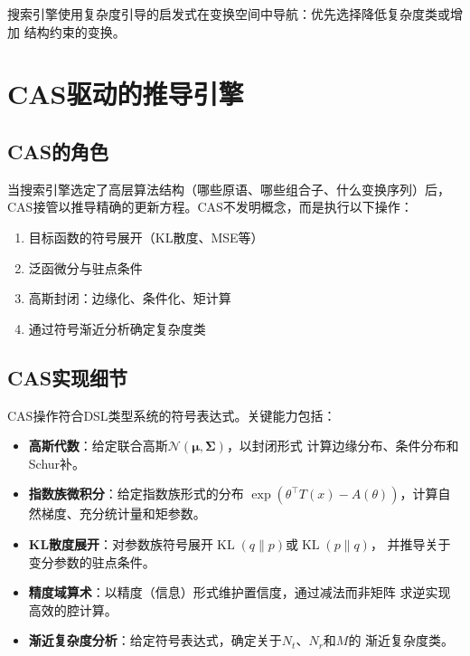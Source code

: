 \documentclass[12pt,a4paper]{article}
\newcommand{\bmu}{\bm{\mu}}
\newcommand{\bSigma}{\bm{\Sigma}}
\newcommand{\calN}{\mathcal{N}}
\DeclareMathOperator{\KL}{KL}
\begin{document}
\noindent
搜索引擎使用复杂度引导的启发式在变换空间中导航：优先选择降低复杂度类或增加
结构约束的变换。

\section{CAS驱动的推导引擎}
\label{sec:cas}

\subsection{CAS的角色}

当搜索引擎选定了高层算法结构（哪些原语、哪些组合子、什么变换序列）后，
CAS接管以推导精确的更新方程。CAS不发明概念，而是执行以下操作：
\begin{enumerate}[itemsep=0pt]
  \item 目标函数的符号展开（KL散度、MSE等）
  \item 泛函微分与驻点条件
  \item 高斯封闭：边缘化、条件化、矩计算
  \item 通过符号渐近分析确定复杂度类
\end{enumerate}

\subsection{CAS实现细节}

CAS操作符合DSL类型系统的符号表达式。关键能力包括：
\begin{itemize}[itemsep=0pt]
  \item \textbf{高斯代数}：给定联合高斯$\calN(\bmu,\bSigma)$，以封闭形式
        计算边缘分布、条件分布和Schur补。
  \item \textbf{指数族微积分}：给定指数族形式的分布
        $\exp(\theta^\top T(x)-A(\theta))$，计算自然梯度、充分统计量和矩参数。
  \item \textbf{KL散度展开}：对参数族符号展开$\KL(q\|p)$或$\KL(p\|q)$，
        并推导关于变分参数的驻点条件。
  \item \textbf{精度域算术}：以精度（信息）形式维护置信度，通过减法而非矩阵
        求逆实现高效的腔计算。
  \item \textbf{渐近复杂度分析}：给定符号表达式，确定关于$N_t$、$N_r$和$M$的
        渐近复杂度类。
\end{itemize}

\end{document}
